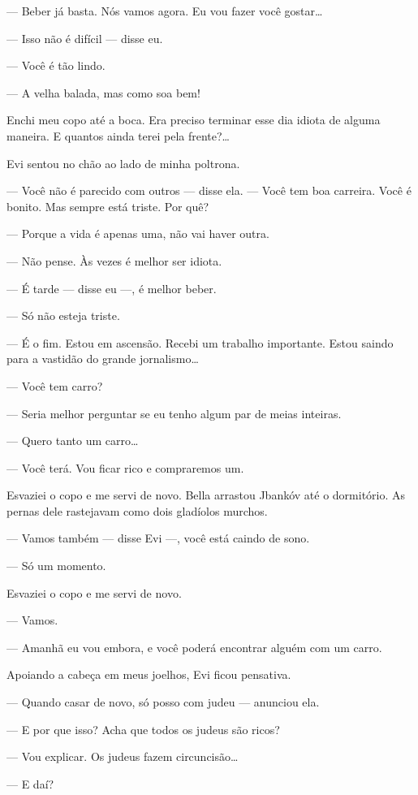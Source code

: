 --- Beber já basta. Nós vamos agora. Eu vou fazer você gostar\ldots{}

--- Isso não é difícil --- disse eu.

--- Você é tão lindo.

--- A velha balada, mas como soa bem!

Enchi meu copo até a boca. Era preciso terminar esse dia idiota de
alguma maneira. E quantos ainda terei pela frente?\ldots{}

Evi sentou no chão ao lado de minha poltrona.

--- Você não é parecido com outros --- disse ela.
--- Você tem boa carreira. Você é bonito. Mas sempre está triste.
Por quê?

--- Porque a vida é apenas uma, não vai haver outra.

--- Não pense. Às vezes é melhor ser idiota.

--- É tarde --- disse eu ---, é melhor beber.

--- Só não esteja triste.

--- É o fim. Estou em ascensão. Recebi um trabalho importante.
Estou saindo para a vastidão do grande jornalismo\ldots{}

--- Você tem carro?

--- Seria melhor perguntar se eu tenho algum par de meias
inteiras.

--- Quero tanto um carro\ldots{}

--- Você terá. Vou ficar rico e compraremos um.

Esvaziei o copo e me servi de novo. Bella arrastou Jbankóv até o
dormitório. As pernas dele rastejavam como dois gladíolos murchos.

--- Vamos também --- disse Evi ---, você está
caindo de sono.

--- Só um momento.

Esvaziei o copo e me servi de novo.

--- Vamos.

--- Amanhã eu vou embora, e você poderá encontrar alguém com um
carro.

Apoiando a cabeça em meus joelhos, Evi ficou pensativa.

--- Quando casar de novo, só posso com judeu --- anunciou
ela.

--- E por que isso? Acha que todos os judeus são ricos?

--- Vou explicar. Os judeus fazem circuncisão\ldots{}

--- E daí?

